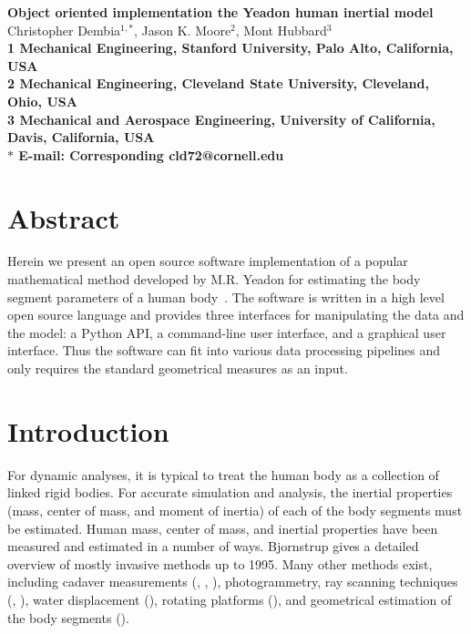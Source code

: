 \documentclass[10pt]{article}
\date{}
\begin{document}
\begin{flushleft}
{\Large
\textbf{Object oriented implementation the Yeadon human inertial model}
}
\\
Christopher Dembia$^{1,\ast}$,
Jason K. Moore$^{2}$,
Mont Hubbard$^{3}$
\\
\bf{1} Mechanical Engineering, Stanford University, Palo Alto, California, USA
\\
\bf{2} Mechanical Engineering, Cleveland State University, Cleveland, Ohio, USA
\\
\bf{3} Mechanical and Aerospace Engineering, University of California, Davis, California, USA
\\
$\ast$ E-mail: Corresponding cld72@cornell.edu
\end{flushleft}

\section*{Abstract}
Herein we present an open source software implementation of a popular
mathematical method developed by M.R. Yeadon for estimating the body segment
parameters of a human body~\cite{Yeadon1990f}. The software is written in a
high level open source language and provides three interfaces for manipulating
the data and the model: a Python API, a command-line user interface, and a
graphical user interface. Thus the software can fit into various data
processing pipelines and only requires the standard geometrical measures as an
input.

\section*{Introduction}
For dynamic analyses, it is typical to treat the human body as a collection of
linked rigid bodies. For accurate simulation and analysis, the inertial
properties (mass, center of mass, and moment of inertia) of each of the body
segments must be estimated. Human mass, center of mass, and inertial properties
have
been measured and estimated in a number of ways. Bjornstrup
\cite{Bjornstrup1995} gives a detailed overview of mostly invasive methods up
to 1995. Many other methods exist, including cadaver measurements
(\cite{Dempster1955}, \cite{Clauser1969}, \cite{Chandler1975}), photogrammetry,
ray scanning techniques (\cite{Zatsiorsky1983}, \cite{Zatsiorsky1990}), water
displacement (\cite{Park1999}), rotating platforms (\cite{Griffiths2005}), and
geometrical estimation of the body segments (\cite{Yeadon1990c}).
\end{document}
